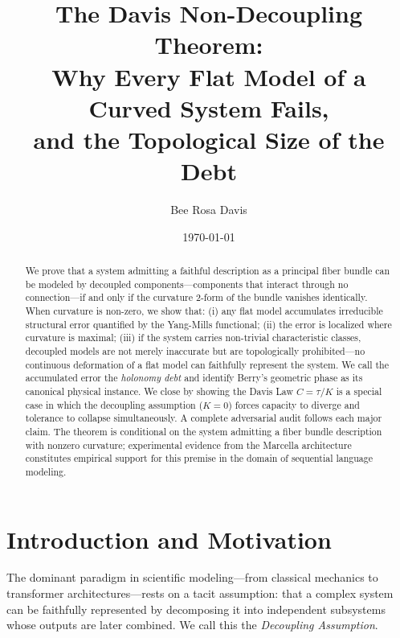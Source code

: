 \documentclass[12pt]{amsart}
\theoremstyle{plain}
\theoremstyle{definition}
\begin{document}
\title[The Davis Non-Decoupling Theorem]{%
  The Davis Non-Decoupling Theorem:\\
  Why Every Flat Model of a Curved System Fails,\\
  and the Topological Size of the Debt}

\author{Bee Rosa Davis}
\address{Independent Researcher}
\date{\today}

\begin{abstract}
We prove that a system admitting a faithful description as a principal fiber
bundle can be modeled by decoupled components---components that interact
through no connection---if and only if the curvature 2-form of the bundle
vanishes identically. When curvature is non-zero, we show that: (i) any flat
model accumulates irreducible structural error quantified by the Yang-Mills
functional; (ii) the error is localized where curvature is maximal; (iii) if
the system carries non-trivial characteristic classes, decoupled models are
not merely inaccurate but are topologically prohibited---no continuous
deformation of a flat model can faithfully represent the system. We call the
accumulated error the \emph{holonomy debt} and identify Berry's geometric
phase as its canonical physical instance. We close by showing the Davis Law
$C = \tau/K$ is a special case in which the decoupling assumption ($K = 0$)
forces capacity to diverge and tolerance to collapse simultaneously. A
complete adversarial audit follows each major claim. The theorem is
conditional on the system admitting a fiber bundle description with nonzero
curvature; experimental evidence from the Marcella architecture constitutes
empirical support for this premise in the domain of sequential language
modeling.
\end{abstract}

\maketitle
\tableofcontents

\section{Introduction and Motivation}

The dominant paradigm in scientific modeling---from classical mechanics to
transformer architectures---rests on a tacit assumption: that a complex
system can be faithfully represented by decomposing it into independent
subsystems whose outputs are later combined. We call this the
\emph{Decoupling Assumption}.
\end{document}
